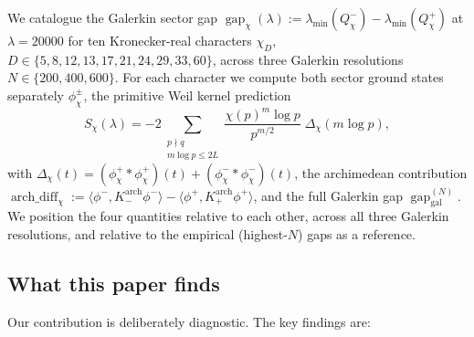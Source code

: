 \documentclass[a4paper,10pt,twocolumn]{article}
\theoremstyle{definition}
\theoremstyle{remark}
\newcommand{\gap}{\operatorname{gap}}
\newcommand{\chifn}{\chi}
\newcommand{\Deltachi}{\Delta_{\chifn}}
\newcommand{\archdiff}{\operatorname{arch\_diff}}
\begin{document}
We catalogue the Galerkin sector gap
$\gap_{\chifn}(\lambda)
  :=\lambda_{\min}(Q^-_{\chifn})-\lambda_{\min}(Q^+_{\chifn})$
at $\lambda=20000$ for ten Kronecker-real characters
$\chi_D$, $D\in\{5,8,12,13,17,21,24,29,33,60\}$,
across three Galerkin resolutions $N\in\{200,400,600\}$. For each
character we compute both sector ground states separately
$\phi^\pm_{\chifn}$, the primitive Weil kernel prediction
\begin{equation}
\label{eq:predictor}
  S_{\chifn}(\lambda)
    = -2\sum_{\substack{p\nmid q\\m\log p\leq 2L}}
      \frac{\chifn(p)^m\log p}{p^{m/2}}\;\Deltachi(m\log p),
\end{equation}
with
$\Deltachi(t)
  =(\phi^+_{\chifn}\!*\phi^+_{\chifn})(t)
    +(\phi^-_{\chifn}\!*\phi^-_{\chifn})(t)$,
the archimedean contribution
$\archdiff_{\chifn}
  :=\langle\phi^-,K^{\mathrm{arch}}_-\phi^-\rangle
    -\langle\phi^+,K^{\mathrm{arch}}_+\phi^+\rangle$,
and the full Galerkin gap $\gap_{\mathrm{gal}}^{(N)}$. We position the
four quantities relative to each other, across all three Galerkin
resolutions, and relative to the empirical (highest-$N$) gaps as a
reference.

\subsection{What this paper finds}
\label{sec:intro-findings}

Our contribution is deliberately diagnostic. The key findings are:
\end{document}
